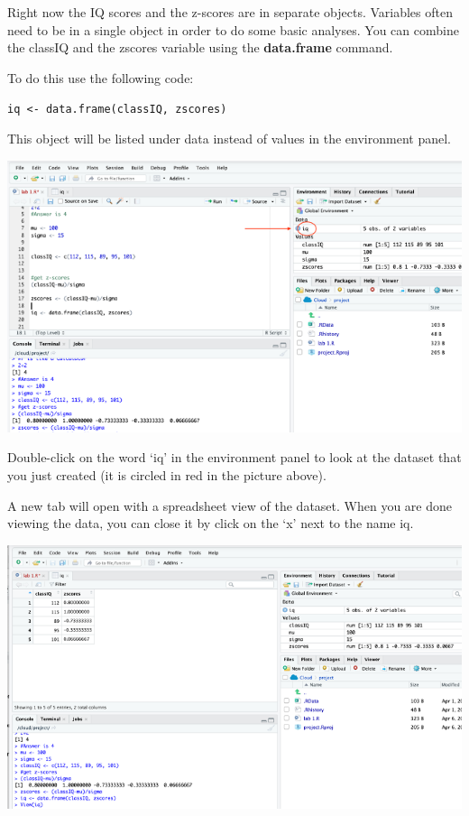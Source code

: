 \documentclass[
]{book}
\begin{document}
Right now the IQ scores and the z-scores are in separate objects. Variables often need to be in a single object in order to do some basic analyses. You can combine the classIQ and the zscores variable using the \textbf{data.frame} command.

To do this use the following code:

\texttt{iq\ \textless{}-\ data.frame(classIQ,\ zscores)}

This object will be listed under data instead of values in the environment panel.

\includegraphics{img/dataframe.png}

Double-click on the word `iq' in the environment panel to look at the dataset that you just created (it is circled in red in the picture above).

A new tab will open with a spreadsheet view of the dataset. When you are done viewing the data, you can close it by click on the `x' next to the name iq.

\includegraphics{img/dataframe2.png}
\end{document}
